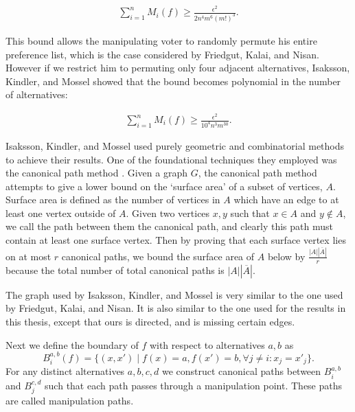 	\begin{align*}
		\sum_{i=1}^n M_i(f) \ge \frac{\epsilon^2}{2 n^4 m^6 (m!)^3}.
	\end{align*}

	This bound allows the manipulating voter to randomly permute his entire preference list, which is the case considered by Friedgut, Kalai, and Nisan. However if we restrict him to permuting only four adjacent alternatives, Isaksson, Kindler, and Mossel showed that the bound becomes polynomial in the number of alternatives:

	\begin{align*}
		\sum_{i=1}^n M_i(f) \ge \frac{\epsilon^2}{10^4 n^3 m^{30}}.
	\end{align*}

	Isaksson, Kindler, and Mossel used purely geometric and combinatorial methods to achieve their results. One of the foundational techniques they employed was the canonical path method \cite{jerrum1993polynomial}. Given a graph $G$, the canonical path method attempts to give a lower bound on the `surface area' of a subset of vertices, $A$. Surface area is defined as the number of vertices in $A$ which have an edge to at least one vertex outside of $A$. Given two vertices $x, y$ such that $x \in A$ and $y \notin A$, we call the path between them the canonical path, and clearly this path must contain at least one surface vertex. Then by proving that each surface vertex lies on at most $r$ canonical paths, we bound the surface area of $A$ below by $\frac{|A| |\overline{A}|}{r}$ because the total number of total canonical paths is $|A| |\overline{A}|$.

	The graph used by Isaksson, Kindler, and Mossel is very similar to the one used by Friedgut, Kalai, and Nisan. It is also similar to the one used for the results in this thesis, except that ours is directed, and is missing certain edges.

	Next we define the boundary of $f$ with respect to alternatives $a, b$ as
	\[
		B^{a,b}_i(f) = \{(x, x') \mid f(x) = a, f(x') = b, \forall j \neq i: x_j = x'_j\}.
	\]
	For any distinct alternatives $a, b, c, d$ we construct canonical paths between $B^{a,b}_i$ and $B^{c,d}_j$ such that each path passes through a manipulation point. These paths are called manipulation paths.

